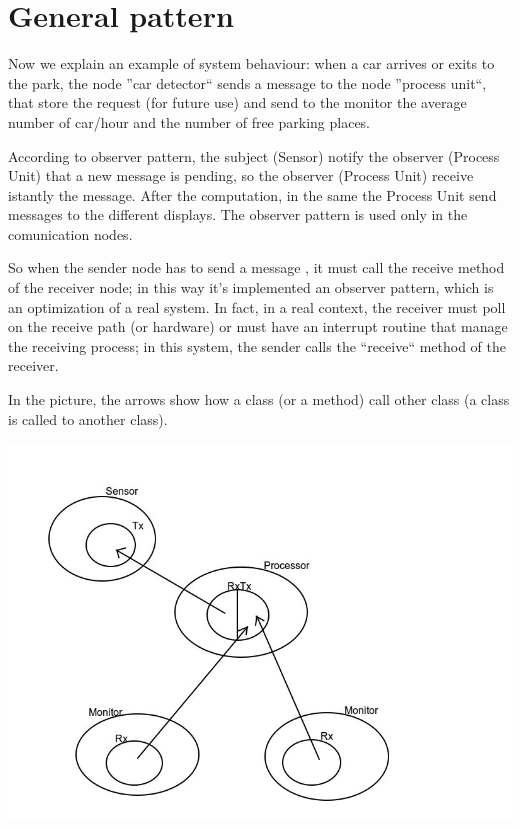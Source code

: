 \documentclass[a4paper,titlepage]{article}
\begin{document}
\newpage
\part{General pattern}

Now we explain an example of system behaviour: when a car arrives or exits to the park, the node ''car detector`` sends a message to the node ''process unit``, that store the request (for future use) and send to the monitor the average number of car/hour and the number of free parking places.

According to observer pattern, the subject (Sensor) notify the observer (Process Unit) that a new message is pending, so the observer (Process Unit) receive istantly the message. After the computation, in the same the Process Unit send messages to the different displays.
The observer pattern is used only in the comunication nodes.

So when the sender node has to send a message , it must call the receive method of the receiver node; in this way it's implemented an observer pattern, which is an optimization of a real system. In fact, in a real context, the receiver must poll on the receive path (or hardware) or must have an interrupt routine that manage the receiving process; in this system, the sender calls the ``receive`` method of the receiver.

In the picture, the arrows show how a class (or a method) call other class (a class is called to another class).

    \begin{center}

    \centering
    \includegraphics[scale=0.40]{pattern.jpg}

    \end{center}
\end{document}
